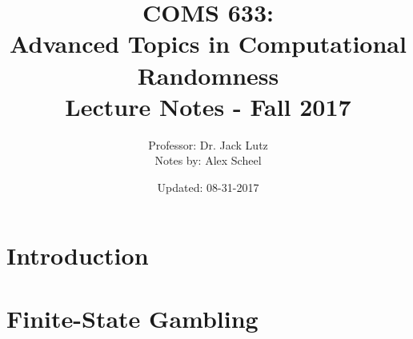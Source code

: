 \documentclass{article}
\title{COMS 633: \\ Advanced Topics in Computational Randomness \\
    \large Lecture Notes - Fall 2017}
\author{Professor: Dr. Jack Lutz \\ Notes by: Alex Scheel}
\date{ Updated: 08-31-2017 }
\theoremstyle{plain}
\theoremstyle{definition}
\begin{document}
 
\maketitle
 
\section{Introduction}
 


\section{Finite-State Gambling}

 
 
\end{document}
